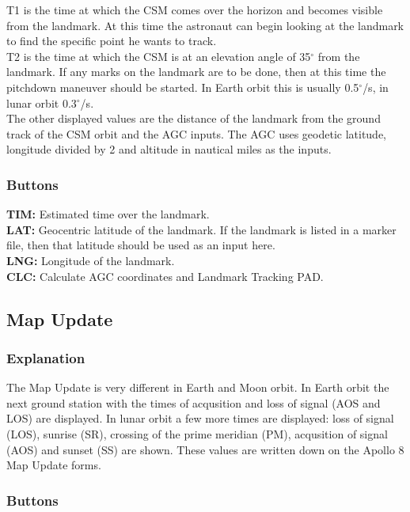 \documentclass[11pt]{article} %
\begin{document}
T1 is the time at which the CSM comes over the horizon and becomes visible from the landmark. At this time the astronaut can begin looking at the landmark to find the specific point he wants to track. \\
T2 is the time at which the CSM is at an elevation angle of 35$^{\circ}$ from the landmark. If any marks on the landmark are to be done, then at this time the pitchdown maneuver should be started. In Earth orbit this is usually 0.5$^{\circ}$/s, in lunar orbit 0.3$^{\circ}$/s. \\
The other displayed values are the distance of the landmark from the ground track of the CSM orbit and the AGC inputs. The AGC uses geodetic latitude, longitude divided by 2 and altitude in nautical miles as the inputs.\\

\subsubsection{Buttons}

\textbf{TIM:} Estimated time over the landmark.\\
\textbf{LAT:} Geocentric latitude of the landmark.  If the landmark is listed in a marker file, then that latitude should be used as an input here.\\
\textbf{LNG:} Longitude of the landmark.\\
\textbf{CLC:} Calculate AGC coordinates and Landmark Tracking PAD.\\

\subsection{Map Update}

\subsubsection{Explanation}

The Map Update is very different in Earth and Moon orbit. In Earth orbit the next ground station with the times of acqusition and loss of signal (AOS and LOS) are displayed.  In lunar orbit a few more times are displayed: loss of signal (LOS), sunrise (SR), crossing of the prime meridian (PM), acqusition of signal (AOS) and sunset (SS) are shown. These values are written down on the Apollo 8 Map Update forms.\\ 

\subsubsection{Buttons}
\end{document}
